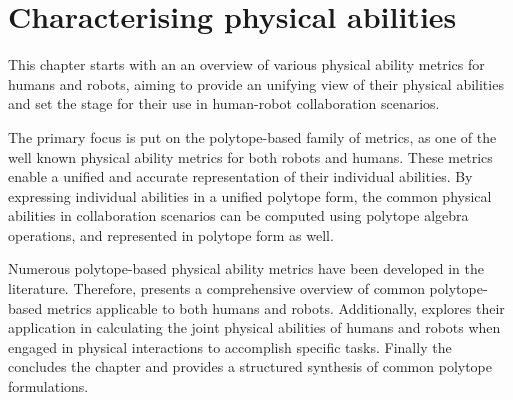 \chapter{Characterising physical abilities} %

\label{ch:phisical_ability_metrics} %


This chapter starts with an an overview of various physical ability metrics for humans and robots, aiming to provide an unifying view of their physical abilities and set the stage for their use in human-robot collaboration scenarios.

The primary focus is put on the polytope-based family of metrics, as one of the well known physical ability metrics for both robots and humans. These metrics enable a unified and accurate representation of their individual abilities. By expressing individual abilities in a unified polytope form, the common physical abilities in collaboration scenarios can be computed using polytope algebra operations, and represented in polytope form as well.

Numerous polytope-based physical ability metrics have been developed in the literature. Therefore,  presents a comprehensive overview of common polytope-based metrics applicable to both humans and robots. Additionally,  explores their application in calculating the joint physical abilities of humans and robots when engaged in physical interactions to accomplish specific tasks. Finally the  concludes the chapter and provides a structured synthesis of common polytope formulations.



